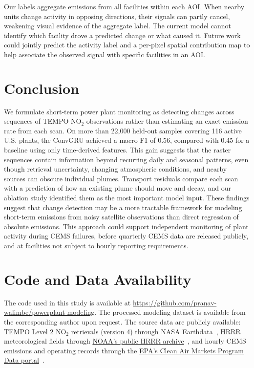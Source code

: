 \documentclass[sigconf,nonacm]{acmart}
\begin{document}
Our labels aggregate emissions from all facilities within each AOI. When nearby units change activity in
opposing directions, their signals can partly cancel, weakening visual evidence of the aggregate label.
The current model cannot identify which facility drove a predicted change or what caused it. Future work could
jointly predict the activity label and a per-pixel spatial contribution map to help associate the observed signal
with specific facilities in an AOI.

\section{Conclusion}

We formulate short-term power plant monitoring as detecting changes across sequences
of TEMPO NO$_2$ observations rather than estimating an exact emission rate from each scan. On more than 22,000 held-out samples covering 116 active U.S. plants,
the ConvGRU achieved a macro-F1 of 0.56, compared with 0.45 for a baseline using only time-derived features. This gain
suggests that the raster sequences contain information beyond recurring daily and seasonal patterns, even though retrieval
uncertainty, changing atmospheric conditions, and nearby sources can obscure individual plumes. Transport residuals compare
each scan with a prediction of how an existing plume should move and decay, and our ablation study identified them as the
most important model input. These findings suggest that change detection may be a more tractable framework for modeling
short-term emissions from noisy satellite observations than direct regression of absolute emissions. This approach
could support independent monitoring of plant activity during CEMS failures, before quarterly CEMS data are released
publicly, and at facilities not subject to hourly reporting requirements.

\section*{Code and Data Availability}

The code used in this study is available at
\url{https://github.com/pranav-walimbe/powerplant-modeling}.
The processed modeling dataset is available from the corresponding author upon
request. The source data are publicly available: TEMPO Level 2 NO$_2$ retrievals
(version 4) through
\href{https://www.earthdata.nasa.gov/data/catalog/larc-cloud-tempo-no2-l2-v04}{NASA Earthdata}~\cite{liu2026tempoNo2L2},
HRRR meteorological fields through
\href{https://registry.opendata.aws/noaa-hrrr-pds/}{NOAA's public HRRR archive}~\cite{noaa2026hrrrArchive},
and hourly CEMS emissions and operating records through the
\href{https://campd.epa.gov/}{EPA's Clean Air Markets Program Data portal}~\cite{epa2026powerSectorData}.



\end{document}
